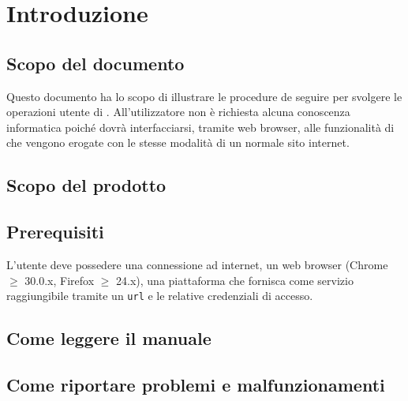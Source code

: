 \section{Introduzione}


\subsection{Scopo del documento}
Questo documento ha lo scopo di illustrare le procedure de seguire per svolgere le operazioni utente di . All'utilizzatore non è richiesta alcuna conoscenza informatica poiché dovrà interfacciarsi, tramite web browser, alle funzionalità di  che vengono erogate con le stesse modalità di un normale sito internet.

\subsection{Scopo del prodotto}
\ScopoDelProdotto 

\subsection{Prerequisiti}
L'utente deve possedere una connessione ad internet, un web browser (Chrome $\geq$ 30.0.x, Firefox $\geq$ 24.x), una piattaforma che fornisca  come servizio raggiungibile tramite un \texttt{url} e le relative credenziali di accesso.

\subsection{Come leggere il manuale}

\subsection{Come riportare problemi e malfunzionamenti}







